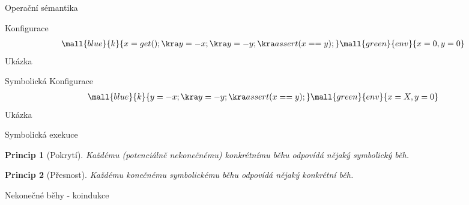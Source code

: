 \documentclass[11pt]{beamer}
\begin{document}
\begin{frame}{Operační sémantika}
\begin{figure}
\begin{tikzpicture}
%
%
%
%


\end{tikzpicture}
\end{figure}
\end{frame}

\begin{frame}{Konfigurace}
\begin{multline*}
\mall{blue}{k}{x=get(); \kra y=-x; \kra y=-y; \kra assert(x == y);} \mall{green}{env}{x=0,y=0}
\end{multline*}
\pause
Ukázka
\end{frame}

\begin{frame}{Symbolická Konfigurace}
\begin{multline*}
\mall{blue}{k}{y=-x; \kra y=-y; \kra assert(x == y);} \mall{green}{env}{x=X,y=0}
\end{multline*}
\pause
Ukázka
\end{frame}

\newtheorem{principle}{Princip}

\begin{frame}{Symbolická exekuce}

\begin{principle}[Pokrytí]
Každému (potenciálně nekonečnému) konkrétnímu běhu odpovídá nějaký symbolický běh.
\end{principle}

\pause

\begin{principle}[Přesnost]
Každému konečnému symbolickému běhu odpovídá nějaký konkrétní běh.
\end{principle}

\pause Nekonečné běhy - koindukce

\end{frame}
\end{document}
